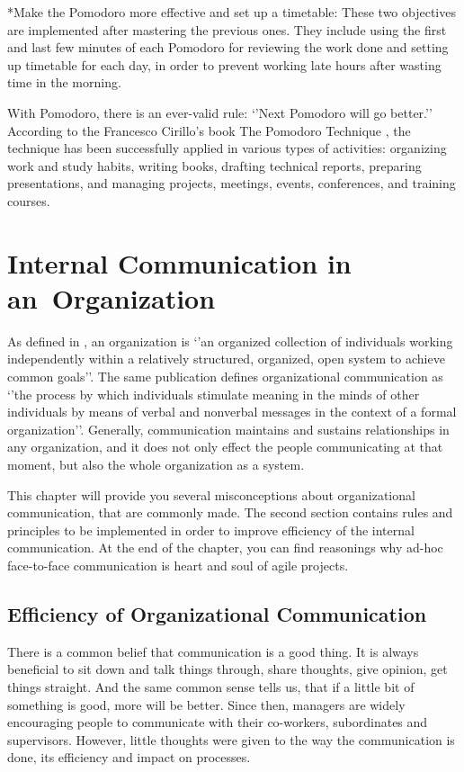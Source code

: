 \documentclass[11pt,singleside]{myfithesis2}
\makeatletter
\renewcommand\paragraph{
   \vspace{-10pt}
   \@startsection{paragraph}{4}{0mm}
      {\baselineskip}
      {- 5pt}
      {\normalfont\normalsize\bfseries}
}
\makeatother
\begin{document}
\paragraph*{Make the Pomodoro more effective and set up a timetable: } These two objectives are implemented after mastering the previous ones. They include using the first and last few minutes of each Pomodoro for reviewing the work done and setting up timetable for each day, in order to prevent working late hours after wasting time in the morning.

\vspace{\baselineskip}
With Pomodoro, there is an ever-valid rule: `'Next Pomodoro will go better.'' According to the Francesco Cirillo's book The Pomodoro Technique \cite{pomodoro}, the technique has been successfully applied in various types of activities: organizing work and study habits, writing books, drafting technical reports, preparing presentations, and managing projects, meetings, events, conferences, and training courses.


\chapter{Internal Communication in an~Organization}\label{internalCommunication}

As defined in \cite{orgCommForSurvival}, an organization is `'an organized collection of individuals working independently within a relatively structured, organized, open system to achieve common goals''. The same publication defines organizational communication as `'the process by which individuals stimulate meaning in the minds of other individuals by means of verbal and nonverbal messages in the context of a formal organization''. Generally, communication maintains and sustains relationships in any organization, and it does not only effect the people communicating at that moment, but also the whole organization as a system.

This chapter will provide you several misconceptions about organizational communication, that are commonly made. The second section contains rules and principles to be implemented in order to improve efficiency of the internal communication. At the end of the chapter, you can find reasonings why ad-hoc face-to-face communication is heart and soul of agile projects.


	\section{Efficiency of Organizational Communication}\label{effOfOrgComm}
There is a common belief that communication is a good thing. It is always beneficial to sit down and talk things through, share thoughts, give opinion, get things straight. And the same common sense tells us, that if a little bit of something is good, more will be better. Since then, managers are widely encouraging people to communicate with their co-workers, subordinates and supervisors. However, little thoughts were given to the way the communication is done, its efficiency and impact on processes. 
\end{document}
